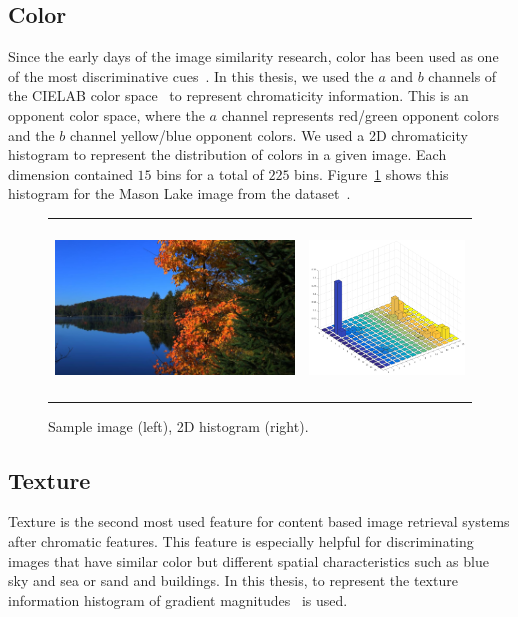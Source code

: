 \subsection{Color}
Since the early days of the image similarity research, color has been used as one of the most discriminative cues~\cite{neumann2006image}. In this thesis,  we used the $a$ and $b$ channels of the CIELAB color space~\cite{iso201111664} to represent chromaticity information. This is an opponent color space, where the $a$ channel represents red/green opponent colors and the $b$ channel yellow/blue opponent colors. We used a 2D chromaticity histogram to represent the distribution of colors in a given image. Each dimension contained $15$ bins for a total of $225$ bins. Figure~\ref{fig:hists} shows this histogram for the Mason Lake image from the dataset~\cite{fairchild2007hdr}.

\begin{figure}
\centering
\begin{tabular}{c c}
\includegraphics[height=1.8in]{figures/chapter2/MasonLake.jpg} &
\includegraphics[height=1.8in]{figures/chapter2/57_histab.png}
\end{tabular}
\caption{Sample image (left), 2D histogram (right).}
\label{fig:hists}
\end{figure}

\subsection{Texture}
Texture is the second most used feature for content based image retrieval systems after chromatic features. This feature is especially helpful for discriminating images that have similar color but different spatial characteristics such as blue sky and sea or sand and buildings. In this thesis, to represent the texture information histogram of gradient magnitudes~\cite{sharma2015histogram} is used. 
